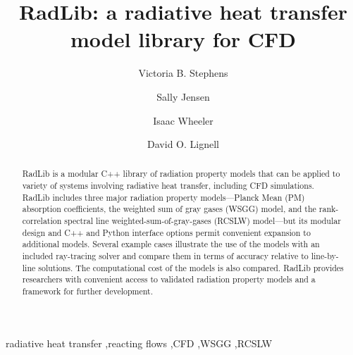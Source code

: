\documentclass[preprint,12pt, a4paper]{elsarticle}
\begin{document}
\begin{frontmatter}



\title{RadLib: a radiative heat transfer model library for CFD}


\author{Victoria B. Stephens}
\author{Sally Jensen}
\author{Isaac Wheeler}
\author{David O. Lignell}


\address{Department of Chemical Engineering, Brigham Young University, Provo, UT 84602, United States}

\begin{abstract}
RadLib is a modular C++ library of radiation property models that can be applied to variety of systems involving radiative heat transfer, including CFD simulations. RadLib includes three major radiation property models---Planck Mean (PM) absorption coefficients, the weighted sum of gray gases (WSGG) model, and the rank-correlation spectral line weighted-sum-of-gray-gases (RCSLW) model---but its modular design and C++ and Python interface options permit convenient expansion to additional models. Several example cases illustrate the use of the models with an included ray-tracing solver and compare them in terms of accuracy relative to line-by-line solutions. The computational cost of the models is also compared. RadLib provides researchers with convenient access to validated radiation property models and a framework for further development. 
\end{abstract}

\begin{keyword}
radiative heat transfer \sep reacting flows  \sep CFD \sep WSGG \sep RCSLW
\end{keyword}

\end{frontmatter}
\end{document}
